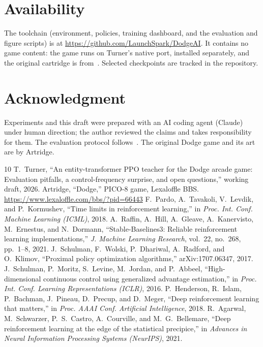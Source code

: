\documentclass[journal]{IEEEtran}
\begin{document}
\section*{Availability}
The toolchain (environment, policies, training dashboard, and the evaluation
and figure scripts) is at \url{https://github.com/LaunchSpark/DodgeAI}. It
contains no game content: the game runs on Turner's native port, installed
separately, and the original cartridge is from~\cite{artridge}. Selected checkpoints are tracked in the repository.

\section*{Acknowledgment}
Experiments and this draft were prepared with an AI coding agent (Claude)
under human direction; the author reviewed the claims and takes
responsibility for them. The evaluation protocol follows~\cite{turner}. The
original Dodge game and its art are by Artridge.

\begin{thebibliography}{10}
T.~Turner, ``An entity-transformer {PPO} teacher for the {Dodge} arcade game:
Evaluation pitfalls, a control-frequency surprise, and open questions,''
working draft, 2026.
Artridge, ``Dodge,'' PICO-8 game, Lexaloffle BBS.
\url{https://www.lexaloffle.com/bbs/?pid=66443}
F.~Pardo, A.~Tavakoli, V.~Levdik, and P.~Kormushev, ``Time limits in
reinforcement learning,'' in \emph{Proc. Int. Conf. Machine Learning (ICML)},
2018.
A.~Raffin, A.~Hill, A.~Gleave, A.~Kanervisto, M.~Ernestus, and N.~Dormann,
``Stable-Baselines3: Reliable reinforcement learning implementations,''
\emph{J. Machine Learning Research}, vol.~22, no.~268, pp.~1--8, 2021.
J.~Schulman, F.~Wolski, P.~Dhariwal, A.~Radford, and O.~Klimov, ``Proximal
policy optimization algorithms,'' arXiv:1707.06347, 2017.
J.~Schulman, P.~Moritz, S.~Levine, M.~Jordan, and P.~Abbeel,
``High-dimensional continuous control using generalized advantage
estimation,'' in \emph{Proc. Int. Conf. Learning Representations (ICLR)},
2016.
P.~Henderson, R.~Islam, P.~Bachman, J.~Pineau, D.~Precup, and D.~Meger, ``Deep
reinforcement learning that matters,'' in \emph{Proc. AAAI Conf. Artificial
Intelligence}, 2018.
R.~Agarwal, M.~Schwarzer, P.~S.~Castro, A.~Courville, and M.~G.~Bellemare,
``Deep reinforcement learning at the edge of the statistical precipice,'' in
\emph{Advances in Neural Information Processing Systems (NeurIPS)}, 2021.
\end{thebibliography}
\end{document}
